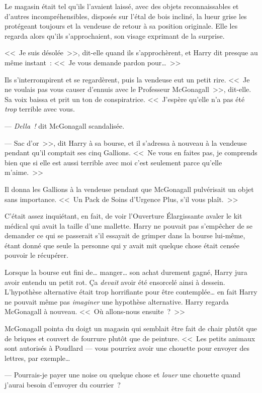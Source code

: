 \later

Le magasin était tel qu'ils l'avaient laissé, avec des objets reconnaissables et d'autres incompréhensibles, disposés sur l'étal de bois incliné, la lueur grise les protégeant toujours et la vendeuse de retour à sa position originale. Elle les regarda alors qu'ils s'approchaient, son visage exprimant de la surprise.

<<~Je suis désolée~>>, dit-elle quand ils s'approchèrent, et Harry dit presque au même instant~: <<~Je vous demande pardon pour…~>>

Ils s'interrompirent et se regardèrent, puis la vendeuse eut un petit rire.
<<~Je ne voulais pas vous causer d'ennuis avec le Professeur McGonagall~>>, dit-elle. Sa voix baissa et prit un ton de conspiratrice. <<~J'espère qu'elle n'a pas été \emph{trop} terrible avec vous.

--- \emph{Della~!} dit McGonagall scandalisée.

--- Sac d'or~>>, dit Harry à sa bourse, et il s'adressa à nouveau à la vendeuse pendant qu'il comptait ses cinq Gallions. <<~Ne vous en faites pas, je comprends bien que si elle est aussi terrible avec moi c'est seulement parce qu'elle m'aime.~>>

Il donna les Gallions à la vendeuse pendant que McGonagall pulvérisait un objet sans importance. <<~Un Pack de Soins d'Urgence Plus, s'il vous plaît.~>>

C'était assez inquiétant, en fait, de voir l'Ouverture Élargissante avaler le kit médical qui avait la taille d'une mallette. Harry ne pouvait pas s'empêcher de se demander ce qui se passerait s'il essayait de grimper dans la bourse lui-même, étant donné que seule la personne qui y avait mit quelque chose était censée pouvoir le récupérer.

Lorsque la bourse eut fini de… manger… son achat durement gagné, Harry jura avoir entendu un petit rot. Ça \emph{devait} avoir été ensorcelé ainsi à dessein. L'hypothèse alternative était trop horrifiante pour être contemplée… en fait Harry ne pouvait même pas \emph{imaginer} une hypothèse alternative. Harry regarda McGonagall à nouveau. <<~Où allons-nous ensuite~?~>>

McGonagall pointa du doigt un magasin qui semblait être fait de chair plutôt que de briques et couvert de fourrure plutôt que de peinture.
<<~Les petits animaux sont autorisés à Poudlard — vous pourriez avoir une chouette pour envoyer des lettres, par exemple…

--- Pourrais-je payer une noise ou quelque chose et \emph{louer} une chouette quand j'aurai besoin d'envoyer du courrier~?

